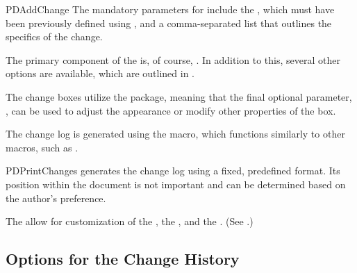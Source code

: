 \documentclass[11pt]{article}
\begin{document}
\begin{PDListing}
\end{PDListing}

\begin{Macrodef}{PDAddChange}{}{}
    The mandatory parameters for  include the , which must have been previously defined using , and a comma-separated  list that outlines the specifics of the change.

    The primary component of the  is, of course, . In addition to this, several other options are available, which are outlined in .

    The change boxes utilize the  package, meaning that the final optional parameter, , can be used to adjust the appearance or modify other properties of the box.
\end{Macrodef}

\begin{PDListing}
\end{PDListing}

The change log is generated using the  macro, which functions similarly to other macros, such as .

\begin{Macrodef}{PDPrintChanges}{}{}
     generates the change log using a fixed, predefined format. Its position within the document is not important and can be determined based on the author's preference.

    The  allow for customization of the , the , and the . (See .)
\end{Macrodef}

\begin{PDListing}
    \PDPrintChanges[version prefix = {V}]
\end{PDListing}

\subsection{Options for the Change History}\label{sec:options-change-history}
\end{document}
